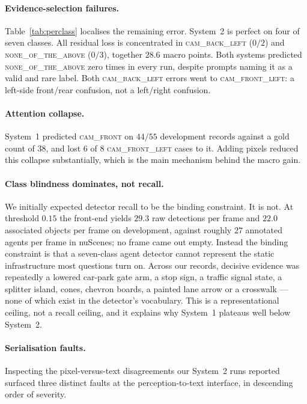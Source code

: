 \documentclass[11pt]{article}
\begin{document}
\paragraph{Evidence-selection failures.} Table~\ref{tab:perclass} localises
the remaining error. System~2 is perfect on four of seven classes. All residual
loss is concentrated in \textsc{cam\_back\_left} ($0/2$) and
\textsc{none\_of\_the\_above} ($0/3$), together $28.6$ macro points. Both
systems predicted \textsc{none\_of\_the\_above} zero times in every run,
despite prompts naming it as a valid and rare label. Both
\textsc{cam\_back\_left} errors went to \textsc{cam\_front\_left}: a
left-side front/rear confusion, not a left/right confusion.

\paragraph{Attention collapse.} System~1 predicted \textsc{cam\_front} on
$44/55$ development records against a gold count of $38$, and lost $6$ of $8$
\textsc{cam\_front\_left} cases to it. Adding pixels reduced this collapse
substantially, which is the main mechanism behind the macro gain.

\paragraph{Class blindness dominates, not recall.} We initially expected
detector recall to be the binding constraint. It is not. At threshold $0.15$
the front-end yields $29.3$ raw detections per frame and
$22.0$ associated objects per frame on development, against roughly $27$
annotated agents per frame in nuScenes; no frame came out empty. Instead the
binding constraint is that a seven-class agent detector cannot represent the
static infrastructure most questions turn on. Across our records, decisive
evidence was repeatedly a lowered car-park gate arm, a stop sign, a traffic
signal state, a splitter island, cones, chevron boards, a painted lane arrow or
a crosswalk --- none of which exist in the detector's vocabulary. This is a
representational ceiling, not a recall ceiling, and it explains why System~1
plateaus well below System~2.

\paragraph{Serialisation faults.} Inspecting the pixel-versus-text
disagreements our System~2 runs reported surfaced three distinct faults at the
perception-to-text interface, in descending order of severity.
\end{document}
